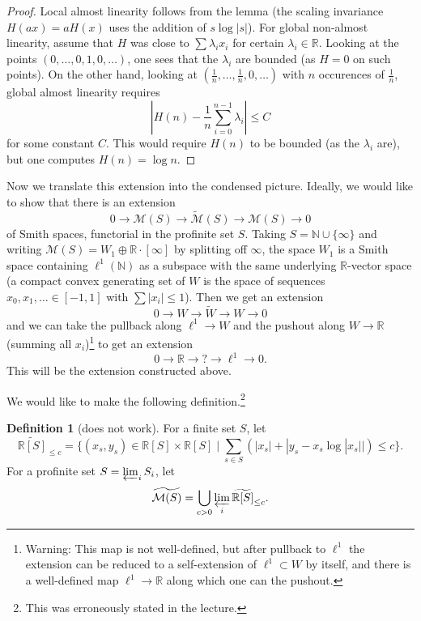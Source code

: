 \documentclass[11pt]{amsbook}
\numberwithin{equation}{section}
\numberwithin{theorem}{section}
\theoremstyle{definition}
\newtheorem{definition}[theorem]{Definition}
\begin{document}
\begin{proof} Local almost linearity follows from the lemma (the scaling invariance $H(a x) = a H(x)$ uses the addition of $s\log|s|$). For global non-almost linearity, assume that $H$ was close to $\sum \lambda_i x_i$ for certain $\lambda_i\in \mathbb R$. Looking at the points $(0,\ldots,0,1,0,\ldots)$, one sees that the $\lambda_i$ are bounded (as $H=0$ on such points). On the other hand, looking at $(\frac 1n,\ldots,\frac 1n,0,\ldots)$ with $n$ occurences of $\frac 1n$, global almost linearity requires
\[
|H(n)-\frac 1n \sum_{i=0}^{n-1} \lambda_i|\leq C
\]
for some constant $C$. This would require $H(n)$ to be bounded (as the $\lambda_i$ are), but one computes $H(n)=\log n$.
\end{proof}

Now we translate this extension into the condensed picture. Ideally, we would like to show that there is an extension
\[
0\to \mathcal M(S)\to \widetilde{\mathcal M}(S)\to \mathcal M(S)\to 0
\]
of Smith spaces, functorial in the profinite set $S$. Taking $S=\mathbb N\cup \{\infty\}$ and writing $\mathcal M(S)=W_1\oplus \mathbb R\cdot[\infty]$ by splitting off $\infty$, the space $W_1$ is a Smith space containing $\ell^1(\mathbb N)$ as a subspace with the same underlying $\mathbb R$-vector space (a compact convex generating set of $W$ is the space of sequences $x_0,x_1,\ldots \in [-1,1]$ with $\sum |x_i|\leq 1$). Then we get an extension
\[
0\to W\to \widetilde{W}\to W\to 0
\]
and we can take the pullback along $\ell^1\to W$ and the pushout along $W\to \mathbb R$ (summing all $x_i$)\footnote{Warning: This map is not well-defined, but after pullback to $\ell^1$ the extension can be reduced to a self-extension of $\ell^1\subset W$ by itself, and there is a well-defined map $\ell^1\to \mathbb R$ along which one can the pushout.} to get an extension
\[
0\to \mathbb R\to ?\to \ell^1\to 0.
\]
This will be the extension constructed above.

We would like to make the following definition.\footnote{This was erroneously stated in the lecture.}

\begin{definition}[does not work] For a finite set $S$, let
\[
\widetilde{\mathbb R[S]}_{\leq c} = \{(x_s,y_s)\in \mathbb R[S]\times \mathbb R[S]\mid \sum_{s\in S}(|x_s|+|y_s-x_s\log|x_s||)\leq c\}.
\]
For a profinite set $S=\varprojlim_i S_i$, let
\[
\widetilde{\mathcal M(S)} = \bigcup_{c>0} \varprojlim_i \widetilde{\mathbb R[S]}_{\leq c}.
\]
\end{definition}
\end{document}
